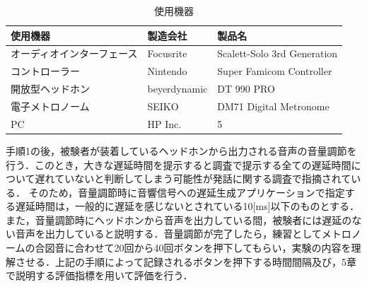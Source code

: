 \begin{table}[tbp]
  \caption{使用機器}
  \label{table:device}
  \centering
  \begin{tabular}{lll}
    \hline
    使用機器 & 製造会社 & 製品名\\
    \hline \hline
    オーディオインターフェース & Focusrite & Scalett-Solo 3rd Generation\\
    コントローラー  & Nintendo & Super Famicom Controller\\
    開放型ヘッドホン & beyerdynamic & DT 990 PRO\\
    電子メトロノーム  & SEIKO  & DM71 Digital Metronome \\
    PC  & HP Inc. & 5 
\\
    \hline
  \end{tabular}
\end{table}

手順1の後，被験者が装着しているヘッドホンから出力される音声の音量調節を行う．このとき，大きな遅延時間を提示すると調査で提示する全ての遅延時間について遅れていないと判断してしまう可能性が発話に関する調査で指摘されている\cite{Soturonn-takahashi}．
そのため，音量調節時に音響信号への遅延生成アプリケーションで指定する遅延時間は，一般的に遅延を感じないとされている10[ms]以下のものとする．また，音量調節時にヘッドホンから音声を出力している間，被験者には遅延のない音声を出力していると説明する．音量調節が完了したら，練習としてメトロノームの合図音に合わせて20回から40回ボタンを押下してもらい，実験の内容を理解させる．上記の手順によって記録されるボタンを押下する時間間隔及び，5章で説明する評価指標を用いて評価を行う．
